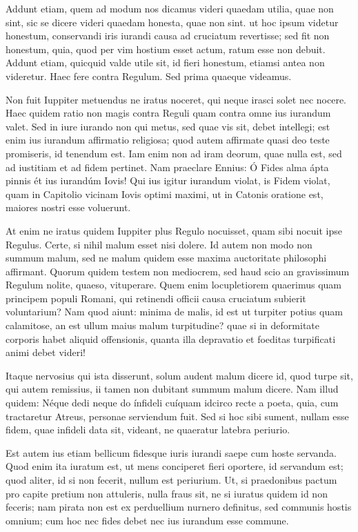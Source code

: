  Addunt etiam, quem ad modum nos dicamus videri quaedam utilia, quae non sint, sic se dicere videri quaedam honesta, quae non sint. ut hoc ipsum videtur honestum, conservandi iris iurandi causa ad cruciatum revertisse; sed fit non honestum, quia, quod per vim hostium esset actum, ratum esse non debuit. Addunt etiam, quicquid valde utile sit, id fieri honestum, etiamsi antea non videretur. Haec fere contra Regulum. Sed prima quaeque videamus.

 Non fuit Iuppiter metuendus ne iratus noceret, qui neque irasci solet nec nocere. Haec quidem ratio non magis contra Reguli quam contra omne ius iurandum valet. Sed in iure iurando non qui metus, sed quae vis sit, debet intellegi; est enim ius iurandum affirmatio religiosa; quod autem affirmate quasi deo teste promiseris, id tenendum est. Iam enim non ad iram deorum, quae nulla est, sed ad iustitiam et ad fidem pertinet. Nam praeclare Ennius: Ó Fides alma ápta pinnis ét ius iurandúm Iovis! Qui ius igitur iurandum violat, is Fidem violat, quam in Capitolio vicinam Iovis optimi maximi, ut in Catonis oratione est, maiores nostri esse voluerunt.

 At enim ne iratus quidem Iuppiter plus Regulo nocuisset, quam sibi nocuit ipse Regulus. Certe, si nihil malum esset nisi dolere. Id autem non modo non summum malum, sed ne malum quidem esse maxima auctoritate philosophi affirmant. Quorum quidem testem non mediocrem, sed haud scio an gravissimum Regulum nolite, quaeso, vituperare. Quem enim locupletiorem quaerimus quam principem populi Romani, qui retinendi officii causa cruciatum subierit voluntarium? Nam quod aiunt: minima de malis, id est ut turpiter potius quam calamitose, an est ullum maius malum turpitudine? quae si in deformitate corporis habet aliquid offensionis, quanta illa depravatio et foeditas turpificati animi debet videri!

 Itaque nervosius qui ista disserunt, solum audent malum dicere id, quod turpe sit, qui autem remissius, ii tamen non dubitant summum malum dicere. Nam illud quidem: Néque dedi neque do ínfideli cuíquam idcirco recte a poeta, quia, cum tractaretur Atreus, personae serviendum fuit. Sed si hoc sibi sument, nullam esse fidem, quae infideli data sit, videant, ne quaeratur latebra periurio.

 Est autem ius etiam bellicum fidesque iuris iurandi saepe cum hoste servanda. Quod enim ita iuratum est, ut mens conciperet fieri oportere, id servandum est; quod aliter, id si non fecerit, nullum est periurium. Ut, si praedonibus pactum pro capite pretium non attuleris, nulla fraus sit, ne si iuratus quidem id non feceris; nam pirata non est ex perduellium nurnero definitus, sed communis hostis omnium; cum hoc nec fides debet nec ius iurandum esse commune.

